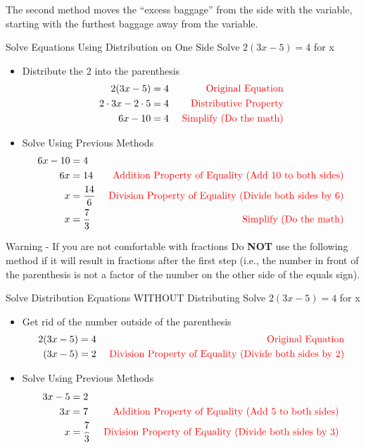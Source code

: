 The second method moves the ``excess baggage'' from the side with the variable, starting with the furthest baggage away from the variable.
\begin{example}{Solve Equations Using Distribution on One Side}{}
    Solve $2(3x-5)=4$ for x
    \begin{itemize}
        \item[] Distribute the 2 into the parenthesis
        \begin{align*}
            2(3x-5)&=4&\textcolor{red}{\textrm{   Original Equation}}\\
            2\cdot 3x -2\cdot 5&=4&\textcolor{red}{\textrm{   Distributive Property}}\\
            6x-10&=4&\textcolor{red}{\textrm{   Simplify (Do the math)}}     
        \end{align*}
        \item[] Solve Using Previous Methods
        \begin{align*}        
            6x-10&=4\\
            6x&=14&\textcolor{red}{\textrm{   Addition Property of Equality (Add 10 to both sides)}}\\
            x&=\dfrac{14}{6}&\textcolor{red}{\textrm{   Division Property of Equality (Divide both sides by 6)}}\\
            x&=\dfrac{7}{3}&\textcolor{red}{\textrm{   Simplify (Do the math)}}
        \end{align*}
    \end{itemize}
\end{example}
\begin{note}{Warning - If you are not comfortable with fractions}{}
    Do \textbf{NOT} use the following method if it will result in fractions after the first step (i.e., the number in front of the parenthesis is not a factor of the number on the other side of the equals sign).
\end{note}
\begin{example}{Solve Distribution Equations WITHOUT Distributing}{}
    Solve $2(3x-5)=4$ for x
    \begin{itemize}
        \item[] Get rid of the number outside of the parenthesis
        \begin{align*}
            2(3x-5)&=4&\textcolor{red}{\textrm{   Original Equation}}\\
            (3x -5)&=2&\textcolor{red}{\textrm{   Division Property of Equality (Divide both sides by 2)}}
        \end{align*}
        \item[] Solve Using Previous Methods
        \begin{align*}              
            3x-5&=2\\
            3x&=7&\textcolor{red}{\textrm{   Addition Property of Equality (Add 5 to both sides)}}\\
            x&=\dfrac{7}{3}&\textcolor{red}{\textrm{   Division Property of Equality (Divide both sides by 3)}}
        \end{align*}
    \end{itemize}
\end{example}